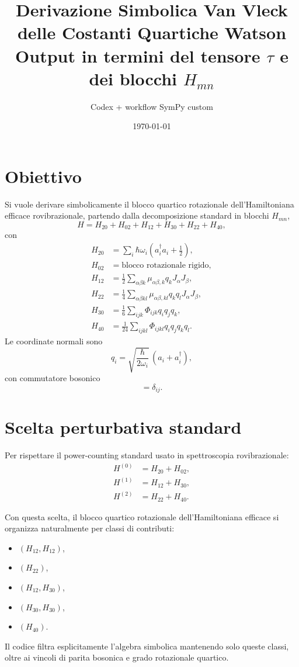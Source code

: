 \documentclass[11pt,a4paper]{article}
\title{Derivazione Simbolica Van Vleck delle Costanti Quartiche Watson\\
\large Output in termini del tensore $\tau$ e dei blocchi $H_{mn}$}
\author{Codex + workflow SymPy custom}
\date{\today}
\begin{document}
\maketitle

\section{Obiettivo}
Si vuole derivare simbolicamente il blocco quartico rotazionale dell'Hamiltoniana efficace rovibrazionale,
partendo dalla decomposizione standard in blocchi \(H_{mn}\),
\begin{equation}
H = H_{20} + H_{02} + H_{12} + H_{30} + H_{22} + H_{40},
\end{equation}
con
\begin{align}
H_{20} &= \sum_i \hbar\omega_i\left(a_i^\dagger a_i + \frac12\right),\\
H_{02} &= \text{blocco rotazionale rigido},\\
H_{12} &= \frac12 \sum_{\alpha\beta k} \mu_{\alpha\beta,k} q_k J_\alpha J_\beta,\\
H_{22} &= \frac14 \sum_{\alpha\beta kl} \mu_{\alpha\beta,kl} q_k q_l J_\alpha J_\beta,\\
H_{30} &= \frac16 \sum_{ijk} \Phi_{ijk} q_i q_j q_k,\\
H_{40} &= \frac1{24} \sum_{ijkl} \Phi_{ijkl} q_i q_j q_k q_l.
\end{align}
Le coordinate normali sono
\begin{equation}
q_i = \sqrt{\frac{\hbar}{2\omega_i}}\,(a_i + a_i^\dagger),
\end{equation}
con commutatore bosonico
\begin{equation}
[a_i,a_j^\dagger]=\delta_{ij}.
\end{equation}

\section{Scelta perturbativa standard}
Per rispettare il power-counting standard usato in spettroscopia rovibrazionale:
\begin{align}
 H^{(0)} &= H_{20} + H_{02},\\
 H^{(1)} &= H_{12} + H_{30},\\
 H^{(2)} &= H_{22} + H_{40}.
\end{align}

Con questa scelta, il blocco quartico rotazionale dell'Hamiltoniana efficace si organizza
naturalmente per classi di contributi:
\begin{itemize}
\item \((H_{12},H_{12})\),
\item \((H_{22})\),
\item \((H_{12},H_{30})\),
\item \((H_{30},H_{30})\),
\item \((H_{40})\).
\end{itemize}
Il codice filtra esplicitamente l'algebra simbolica mantenendo solo queste classi, oltre ai
vincoli di parita bosonica e grado rotazionale quartico.
\end{document}
